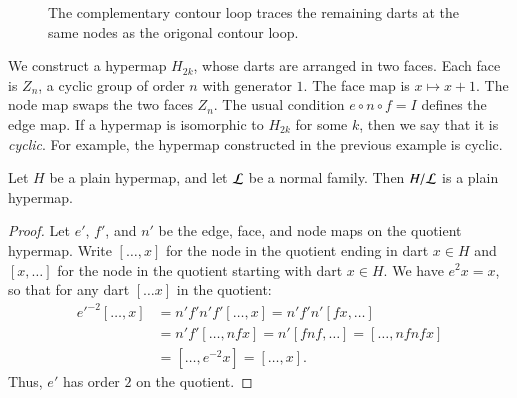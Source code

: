 \begin{figure}[htb]
  \centering
  \caption{The complementary contour loop traces the remaining darts
   at the same nodes as the origonal contour loop.}
  \label{fig:contour-comp}
\end{figure}


\begin{example}\label{ex:H2k} 
We 
construct a
hypermap $H_{2k}$, whose darts are arranged in two faces.  Each
face is $Z_n$, a cyclic group of order $n$ with generator $1$.
The face map is $x\mapsto x+1$.
The node map swaps the two faces $Z_n$.
The usual condition $e\circ n\circ f = I$ defines the edge map.
If a hypermap is isomorphic to $H_{2k}$ for
some $k$, then we say that it is {\it cyclic}.  For example,
the hypermap constructed in the previous example is cyclic.
\end{example}

\begin{lemma} Let $H$ be a plain hypermap, and let $\cal L$ be a
normal family.  Then $H/{\cal L}$ is a plain hypermap.
\end{lemma}

\begin{proof} Let $e'$, $f'$, and $n'$ be the edge, face, and node maps on the
quotient hypermap.  Write $[\ldots, x]$ for the node in the quotient
ending in dart $x\in H$ and $[x,\ldots]$ for the node in the quotient
starting with dart $x\in H$.  We have $e^2 x = x$, so that for any
dart $[\ldots x]$ in the quotient:
    $$\begin{array}{lll}
    {e'}^{-2} [\ldots, x] &= n' f' n' f' [\ldots, x] = n' f' n' [f x, \ldots] \\&=
    n' f' [\ldots, n f x] = n' [f n f, \ldots] = [\ldots, n f n f x]\\ &=
    [\ldots, e^{-2} x] = [\ldots, x].
    \end{array}$$
Thus, $e'$ has order $2$ on the quotient.
\end{proof}

%


